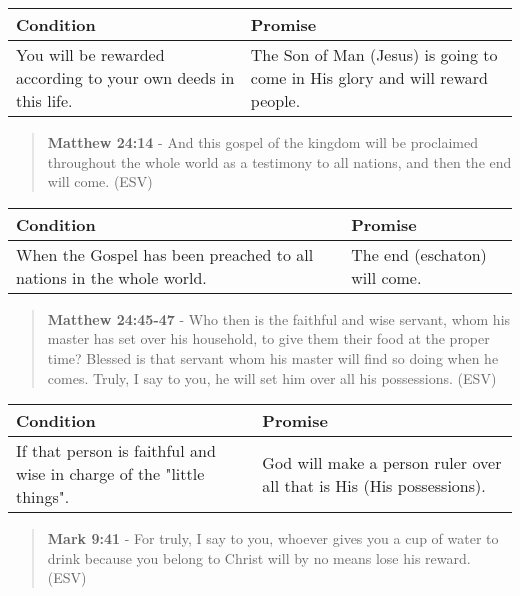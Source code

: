\documentclass[11pt]{article}
\begin{document}
\begin{center}
\begin{tabular}{ll}
Condition & Promise\\[0pt]
\hline
You will be rewarded according to your own deeds in this life. & The Son of Man (Jesus) is going to come in His glory and will reward people.\\[0pt]
\end{tabular}
\end{center}

\begin{quote}
\textbf{Matthew 24:14} - And this gospel of the kingdom will be proclaimed throughout the whole world as a testimony to all nations, and then the end will come. (ESV)
\end{quote}

\begin{center}
\begin{tabular}{ll}
Condition & Promise\\[0pt]
\hline
When the Gospel has been preached to all nations in the whole world. & The end (eschaton) will come.\\[0pt]
\end{tabular}
\end{center}

\begin{quote}
\textbf{Matthew 24:45-47} - Who then is the faithful and wise servant, whom his master has set over his household, to give them their food at the proper time? Blessed is that servant whom his master will find so doing when he comes. Truly, I say to you, he will set him over all his possessions. (ESV)
\end{quote}

\begin{center}
\begin{tabular}{ll}
Condition & Promise\\[0pt]
\hline
If that person is faithful and wise in charge of the "little things". & God will make a person ruler over all that is His (His possessions).\\[0pt]
\end{tabular}
\end{center}

\begin{quote}
\textbf{Mark 9:41} - For truly, I say to you, whoever gives you a cup of water to drink because you belong to Christ will by no means lose his reward. (ESV)
\end{quote}
\end{document}
